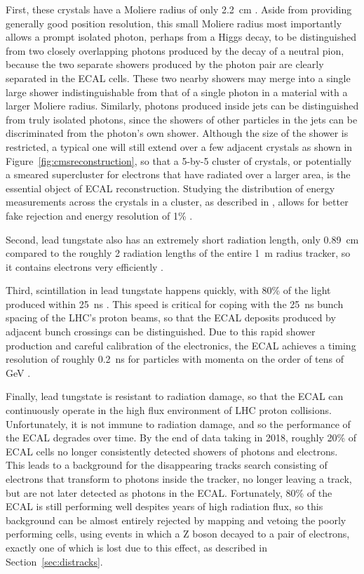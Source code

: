   First, these crystals have a Moliere radius of only 2.2~cm \cite{cms_tdr}.
  Aside from providing generally good position resolution, this small Moliere radius most importantly allows a prompt isolated photon, perhaps from a Higgs decay, to be distinguished from two closely overlapping photons produced by the decay of a neutral pion, because the two separate showers produced by the photon pair are clearly separated in the ECAL cells.
  These two nearby showers may merge into a single large shower indistinguishable from that of a single photon in a material with a larger Moliere radius.
  Similarly, photons produced inside jets can be distinguished from truly isolated photons, since the showers of other particles in the jets can be discriminated from the photon's own shower.
  Although the size of the shower is restricted, a typical one will still extend over a few adjacent crystals as shown in Figure~\ref{fig:cmsreconstruction}, so that a 5-by-5 cluster of crystals, or potentially a smeared supercluster for electrons that have radiated over a larger area, is the essential object of ECAL reconstruction.
  Studying the distribution of energy measurements across the crystals in a cluster, as described in \cite{ecal_algorithm}, allows for better fake rejection and energy resolution of 1\% \cite{ecal_energy_resolution}.

  Second, lead tungstate also has an extremely short radiation length, only 0.89~cm compared to the roughly 2 radiation lengths of the entire 1~m radius tracker, so it contains electrons very efficiently \cite{cms_tdr}.

  Third, scintillation in lead tungstate happens quickly, with 80\% of the light produced within 25~ns \cite{cms_tdr}. 
  This speed is critical for coping with the 25~ns bunch spacing of the LHC's proton beams, so that the ECAL deposits produced by adjacent bunch crossings can be distinguished.
  Due to this rapid shower production and careful calibration of the electronics, the ECAL achieves a timing resolution of roughly 0.2~ns for particles with momenta on the order of tens of GeV \cite{ecaltiming}.

  Finally, lead tungstate is resistant to radiation damage, so that the ECAL can continuously operate in the high flux environment of LHC proton collisions.
  Unfortunately, it is not immune to radiation damage, and so the performance of the ECAL degrades over time.
  By the end of data taking in 2018, roughly 20\% of ECAL cells no longer consistently detected showers of photons and electrons.
  This leads to a background for the disappearing tracks search consisting of electrons that transform to photons inside the tracker, no longer leaving a track, but are not later detected as photons in the ECAL.
  Fortunately, 80\% of the ECAL is still performing well despites years of high radiation flux, so this background can be almost entirely rejected by mapping and vetoing the poorly performing cells, using events in which a Z boson decayed to a pair of electrons, exactly one of which is lost due to this effect, as described in Section~\ref{sec:distracks}.

